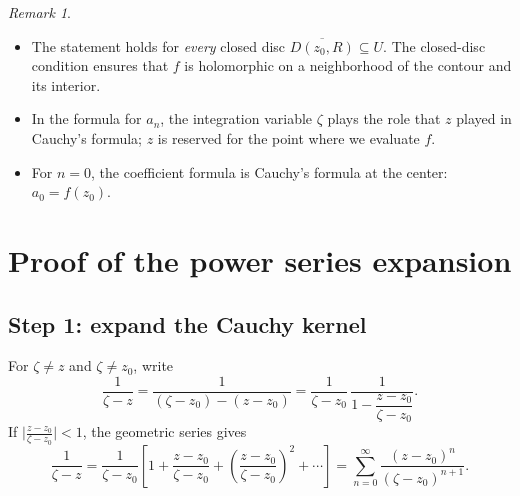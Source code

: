 \documentclass[11pt]{article}
\theoremstyle{plain}
\theoremstyle{definition}
\theoremstyle{remark}
\newtheorem*{remark}{Remark}
\numberwithin{equation}{section}
\newenvironment{lecturefigure}
 {\par\addvspace{0.25em}\begingroup\setlength{\parskip}{0pt}\centering}
 {\par\endgroup\addvspace{0.25em}}
\begin{document}
\begin{lecturefigure}
\end{lecturefigure}

\begin{remark}
\begin{itemize}
 \item The statement holds for \emph{every} closed disc
 $\overline{D(z_0,R)}\subseteq U$. The closed-disc condition ensures that
 $f$ is holomorphic on a neighborhood of the contour and its interior.
 \item In the formula for $a_n$, the integration variable $\zeta$ plays
 the role that $z$ played in Cauchy's formula; $z$ is reserved for the
 point where we evaluate $f$.
 \item For $n=0$, the coefficient formula is Cauchy's formula at the
 center: $a_0=f(z_0)$.
\end{itemize}
\end{remark}

\section{Proof of the power series expansion}
\subsection{Step 1: expand the Cauchy kernel}
For $\zeta\ne z$ and $\zeta\ne z_0$, write
\[
 \frac{1}{\zeta-z}
 =\frac{1}{(\zeta-z_0)-(z-z_0)}
 =\frac{1}{\zeta-z_0}\,\frac{1}{1-\dfrac{z-z_0}{\zeta-z_0}}.
\]
If $\bigl|\frac{z-z_0}{\zeta-z_0}\bigr|<1$, the geometric series gives
\begin{equation}\label{eq:kernel}
 \frac{1}{\zeta-z}
 =\frac{1}{\zeta-z_0}\left[1+\frac{z-z_0}{\zeta-z_0}
   +\left(\frac{z-z_0}{\zeta-z_0}\right)^2+\cdots\right]
 =\sum_{n=0}^{\infty}\frac{(z-z_0)^n}{(\zeta-z_0)^{n+1}}.
\end{equation}
\end{document}
